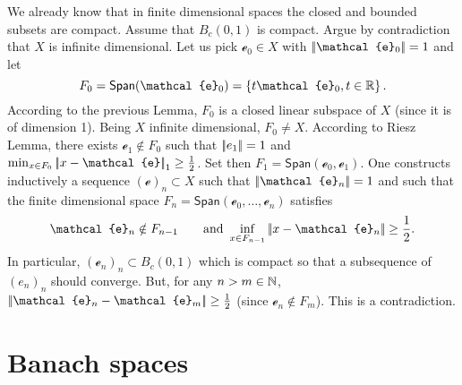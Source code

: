 \documentclass{article}
\begin{document}
\begin{fancyproof}
	We already know that in finite dimensional spaces the closed and bounded subsets are compact. Assume that $B_{c}(0,1)$ is compact. Argue by contradiction that $X$ is infinite dimensional. Let us pick $\mathcal{e}_{0}\in X$ with $\norm{\mathcal{e}_{0}}=1$ and let $$F_0=\mathsf{Span}(\mathcal{e}_{0})=\left\{t\mathcal{e}_{0},t\in\R\right\}.$$
	According to the previous Lemma, $F_{0}$ is a closed linear subspace of $X$ (since it is of dimension 1). Being $X$ infinite dimensional, $F_{0}\neq X$. According to Riesz Lemma, there exists $\mathcal{e}_{1}\notin F_{0}$ such that $\left|\negthinspace\left|e_{1}\right|\negthinspace\right|=1$ and $\min_{x\in F_{0}}\norm{x-\mathcal{e}}_{1}\geq\unmezz$. Set then $F_{1}=\mathsf{Span}(\mathcal{e}_{0},\mathcal{e}_{1})$. One constructs inductively a sequence ${(\mathcal{e})}_{n}\subset X$ such that $\norm{\mathcal{e}_{n}}=1$ and such that the finite dimensional space $F_{n}=\mathsf{Span}(\mathcal{e}_{0},\ldots,\mathcal{e}_{n})$ satisfies
	\begin{equation*}
		\mathcal{e}_{n}\notin F_{n-1}\qquad\text{and }\inf_{x\in F_{n-1}}\norm{x-\mathcal{e}_{n}}\geq\unmezz.
	\end{equation*}
	In particular, ${(\mathcal{e}_{n})}_{n}\subset B_{c}(0,1)$ which is compact so that a subsequence of ${(e_{n})}_{n}$ should converge. But, for any $n>m\in\mathbb{N}$, $\norm{\mathcal{e}_{n}-\mathcal{e}_{m}}\geq\unmezz$ (since $\mathcal{e}_{n}\notin F_{m}$). This is a contradiction.
\end{fancyproof}
\section{Banach spaces}
\end{document}
